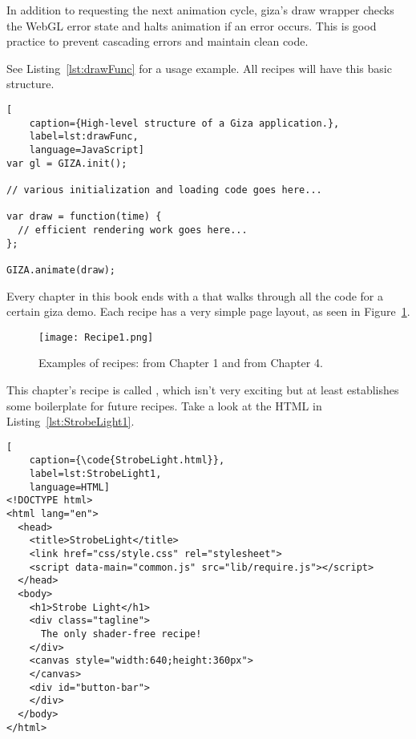 In addition to requesting the next animation cycle, giza's draw wrapper checks the WebGL error state and halts animation if an error occurs.  This is good practice to prevent cascading errors and maintain clean code.

See Listing~\ref{lst:drawFunc} for a usage example.  All recipes will have this basic structure.

\begin{lstlisting}[
    caption={High-level structure of a Giza application.},
    label=lst:drawFunc,
    language=JavaScript]
var gl = GIZA.init();

// various initialization and loading code goes here...

var draw = function(time) {
  // efficient rendering work goes here...
};

GIZA.animate(draw);
\end{lstlisting}


Every chapter in this book ends with a  that walks through all the code for a certain giza demo.  Each recipe has a very simple page layout, as seen in Figure~\ref{fig:Recipe1}.

\begin{figure}[htb]\centering
  \texttt{[image: Recipe1.png]}
  \caption{Examples of recipes:  from Chapter 1 and  from Chapter 4.}
  \label{fig:Recipe1}
\end{figure}

This chapter's recipe is called , which isn't very exciting but at least establishes some boilerplate for future recipes.  Take a look at the HTML in Listing~\ref{lst:StrobeLight1}.

\begin{lstlisting}[
    caption={\code{StrobeLight.html}},
    label=lst:StrobeLight1,
    language=HTML]
<!DOCTYPE html>
<html lang="en">
  <head>
    <title>StrobeLight</title>
    <link href="css/style.css" rel="stylesheet">
    <script data-main="common.js" src="lib/require.js"></script>
  </head>
  <body>
    <h1>Strobe Light</h1>
    <div class="tagline">
      The only shader-free recipe!
    </div>
    <canvas style="width:640;height:360px">
    </canvas>
    <div id="button-bar">
    </div>
  </body>
</html>
\end{lstlisting} 

